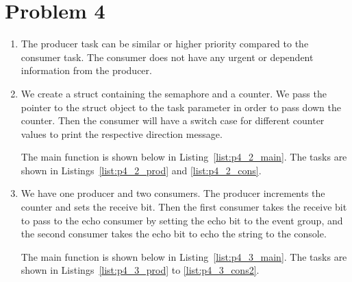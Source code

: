 \section*{Problem 4}
\begin{enumerate}
\item
The producer task can be similar or higher priority compared to the consumer task. The consumer does not have any urgent or dependent information from the producer. 

\item
We create a struct containing the semaphore and a counter. We pass the pointer to the struct object to the task parameter in order to pass down the counter. Then the consumer will have a switch case for different counter values to print the respective direction message.

The main function is shown below in Listing~\ref{list:p4_2_main}. The tasks are shown in Listings~\ref{list:p4_2_prod} and \ref{list:p4_2_cons}.





\item
We have one producer and two consumers. The producer increments the counter and sets the receive bit. Then the first consumer takes the receive bit to pass to the echo consumer by setting the echo bit to the event group, and the second consumer takes the echo bit to echo the string to the console.

The main function is shown below in Listing~\ref{list:p4_3_main}. The tasks are shown in Listings~\ref{list:p4_3_prod} to \ref{list:p4_3_cons2}.






\end{enumerate}